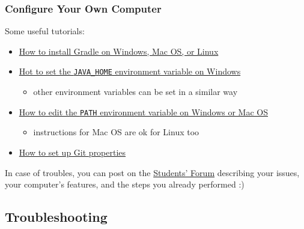 \documentclass[handout]{beamer}\mode<presentation>{\usetheme{AMSCesenaPurpleAndGold}}
\begin{document}
\begin{frame}
\frametitle{Configure Your Own Computer}

	Some useful tutorials:
	\begin{itemize} 
		
		\item \href{https://docs.gradle.org/current/userguide/installation.html\#installing_manually}{How to install Gradle on Windows, Mac OS, or Linux}
		
		\item	 \href{https://confluence.atlassian.com/doc/setting-the-java_home-variable-in-windows-8895.html}{Hot to set the \texttt{JAVA\_HOME} environment variable on Windows}
		\begin{itemize}
			\item other environment variables can be set in a similar way
		\end{itemize}
		
		\item \href{https://www.java.com/en/download/help/path.xml}{How to edit the \texttt{PATH} environment variable on Windows or Mac OS}
		\begin{itemize}
			\item instructions for Mac OS are ok for Linux too
		\end{itemize}
	
	
		\item \href{https://git-scm.com/book/en/v2/Customizing-Git-Git-Configuration}{How to set up Git properties}
	\end{itemize}

	\begin{block}{}
		In case of troubles, you can post on the \href{https://iol.unibo.it/mod/forum/view.php?id=123707}{Students' Forum} \alert{describing your issues}, your computer's features, and the steps you already performed :)
	\end{block}

\end{frame}

\subsection{Troubleshooting}
\end{document}
